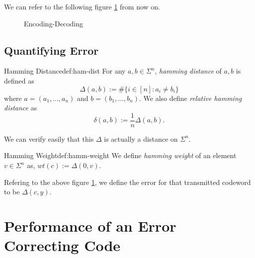We can refer to the following figure \ref{enc-dec} from now on. 
\newline
\begin{figure}[h]
	\centering
	\label{enc-dec}
		\caption{Encoding-Decoding}
\end{figure}


\subsection{Quantifying Error}
\begin{definition}{Hamming Distance}{def:ham-dist}
For any $a, b\in\Sigma^n$, \textit{hamming distance} of $a,b$ is defined as
\[
\Delta(a,b) := \# \{i\in[n] : a_i\neq b_i\}
\]
where $a = (a_1,\ldots, a_n)$ and $b = (b_1, \ldots, b_n)$. We also define \textit{relative hamming distance} as 
\[
\delta (a,b) := \frac{1}{n}\Delta(a,b).
\]
\end{definition}
\begin{remark}
We can verify easily that this $\Delta$ is actually a distance on $\Sigma^n$.
\end{remark}

\begin{definition}{Hamming Weight}{def:hamm-weight}
We define \textit{hamming weight} of an element $v\in\Sigma^n$ as, $wt(c) := \Delta(0,v)$.
\end{definition}

Refering to the above figure \ref{enc-dec}, we define the error for that transmitted codeword to be $\Delta(c,y)$.

\section{Performance of an Error Correcting Code}

